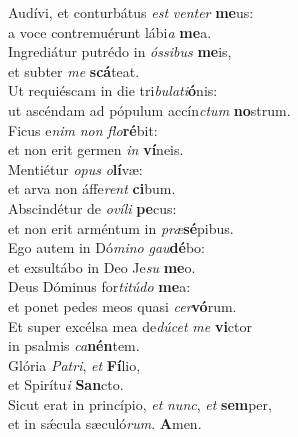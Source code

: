 \evenverse Audívi, et conturbátus \textit{est} \textit{ven}\textit{ter} \textbf{me}us:~\*\\
\evenverse a voce contremuérunt lábi\textit{a} \textbf{me}a.\\
\oddverse Ingrediátur putrédo in \textit{ós}\textit{si}\textit{bus} \textbf{me}is,~\*\\
\oddverse et subter \textit{me} \textbf{scá}teat.\\
\evenverse Ut requiéscam in die tri\textit{bu}\textit{la}\textit{ti}\textbf{ó}nis:~\*\\
\evenverse ut ascéndam ad pópulum accín\textit{ctum} \textbf{no}strum.\\
\oddverse Ficus e\textit{nim} \textit{non} \textit{flo}\textbf{ré}bit:~\*\\
\oddverse et non erit germen \textit{in} \textbf{ví}neis.\\
\evenverse Mentiétur \textit{o}\textit{pus} \textit{o}\textbf{lí}væ:~\*\\
\evenverse et arva non áffe\textit{rent} \textbf{ci}bum.\\
\oddverse Abscindétur de \textit{o}\textit{ví}\textit{li} \textbf{pe}cus:~\*\\
\oddverse et non erit arméntum in \textit{præ}\textbf{sé}pibus.\\
\evenverse Ego autem in Dó\textit{mi}\textit{no} \textit{gau}\textbf{dé}bo:~\*\\
\evenverse et exsultábo in Deo Je\textit{su} \textbf{me}o.\\
\oddverse Deus Dóminus for\textit{ti}\textit{tú}\textit{do} \textbf{me}a:~\*\\
\oddverse et ponet pedes meos quasi \textit{cer}\textbf{vó}rum.\\
\evenverse Et super excélsa mea de\textit{dú}\textit{cet} \textit{me} \textbf{vi}ctor~\*\\
\evenverse in psalmis \textit{ca}\textbf{nén}tem.\\
\oddverse Glória \textit{Pa}\textit{tri}, \textit{et} \textbf{Fí}lio,~\*\\
\oddverse et Spirítu\textit{i} \textbf{San}cto.\\
\evenverse Sicut erat in princípio, \textit{et} \textit{nunc}, \textit{et} \textbf{sem}per,~\*\\
\evenverse et in sǽcula sæculó\textit{rum}. \textbf{A}men.\\
